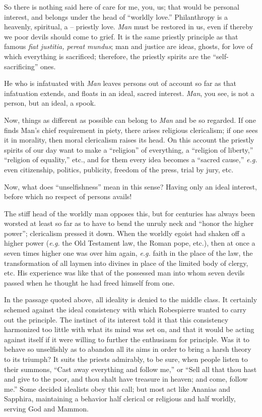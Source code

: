 So there is nothing said here of care for me, you, us; that would be personal 
interest, and belongs under the head of ``worldly love.'' Philanthropy is a 
heavenly, spiritual, a -- priestly love. \textit{Man} must be restored in us, 
even if thereby we poor devils should come to grief. It is the same priestly 
principle as that famous \textit{fiat justitia, pereat mundus}; man and 
justice are ideas, ghosts, for love of which everything is sacrificed; 
therefore, the priestly spirits are the ``self-sacrificing'' ones.

He who is infatuated with \textit{Man} leaves persons out of account so far as 
that infatuation extends, and floats in an ideal, sacred interest. 
\textit{Man}, you see, is not a person, but an ideal, a spook.

Now, things as different as possible can belong to \textit{Man} and be so 
regarded. If one finds Man's chief requirement in piety, there arises 
religious clericalism; if one sees it in morality, then moral clericalism 
raises its head. On this account the priestly spirits of our day want to make 
a ``religion'' of everything, a ``religion of liberty,'' ``religion of 
equality,'' etc., and for them every idea becomes a ``sacred cause,'' 
\textit{e.g.} even citizenship, politics, publicity, freedom of the press, 
trial by jury, etc.

Now, what does ``unselfishness'' mean in this sense? Having only an ideal 
interest, before which no respect of persons avails!

The stiff head of the worldly man opposes this, but for centuries has always 
been worsted at least so far as to have to bend the unruly neck and ``honor 
the higher power''; clericalism pressed it down. When the worldly egoist had 
shaken off a higher power (\textit{e.g.} the Old Testament law, the Roman 
pope, etc.), then at once a seven times higher one was over him again, 
\textit{e.g.} faith in the place of the law, the transformation of all laymen 
into divines in place of the limited body of clergy, etc. His experience was 
like that of the possessed man into whom seven devils passed when he thought 
he had freed himself from one.

In the passage quoted above, all ideality is denied to the middle class. It 
certainly schemed against the ideal consistency with which Robespierre wanted 
to carry out the principle. The instinct of its interest told it that this 
consistency harmonized too little with what its mind was set on, and that it 
would be acting against itself if it were willing to further the enthusiasm 
for principle. Was it to behave so unselfishly as to abandon all its aims in 
order to bring a harsh theory to its triumph? It suits the priests admirably, 
to be sure, when people listen to their summons, ``Cast away everything and 
follow me,'' or ``Sell all that thou hast and give to the poor, and thou 
shalt have treasure in heaven; and come, follow me.'' Some decided idealists 
obey this call; but most act like Ananias and Sapphira, maintaining a behavior 
half clerical or religious and half worldly, serving God and Mammon.


